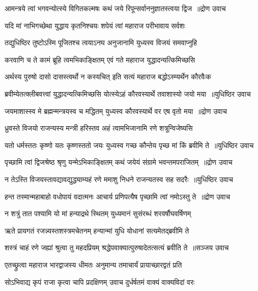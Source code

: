 \threelineshloka
{आमन्त्रये त्वां भगवन्योत्स्ये विगितकल्मषः}
{कथं जये रिपून्सर्वाननुज्ञातस्त्वया द्विज ॥द्रोण उवाच}
{}


\twolineshloka
{यदि मां नाभिगच्छेथा युद्धाय कृतनिश्चयः}
{शपेयं त्वां महाराज परीभावाय सर्वशः}


\twolineshloka
{तद्युधिष्ठिर तुष्टोऽस्मि पूजितश्च त्वयाऽनघ}
{अनुजानामि युध्यस्व विजयं समवाप्नुहि}


\twolineshloka
{करवाणि च ते कामं ब्रूहि त्वमभिकाङ्क्षितम्}
{एवं गते महाराज युद्धादन्यत्किमिच्छसि}


\twolineshloka
{अर्थस्य पुरुषो दासो दासस्त्वर्थो न कस्यचित्}
{इति सत्यं महाराज बद्धोऽस्म्यर्थेन कौरवैःक}


\threelineshloka
{ब्रवीम्येतत्क्लीबवत्त्वां युद्धादन्यत्किमिच्छसि}
{योत्स्येऽहं कौरवस्यार्थे तवाशास्यो जयो मया ॥युधिष्ठिर उवाच}
{}


\threelineshloka
{जयमाशास्स्व मे ब्रह्मन्मन्त्रयस्व च मद्धितम्}
{युध्यस्व कौरवस्यार्थे वर एष वृतो मया ॥द्रोण उवाच}
{}


\twolineshloka
{ध्रुवस्ते विजयो राजन्यस्य मन्त्री हरिस्तव}
{अहं त्वामभिजानामि रणे शत्रून्विजेष्यसि}


\threelineshloka
{यतो धर्मस्ततः कृष्णो यतः कृष्णस्ततो जयः}
{युध्यस्व गच्छ कौन्तेय पृच्छ मां किं ब्रवीमि ते ॥युधिष्ठिर उवाच}
{}


\threelineshloka
{पृच्छामि त्वां द्विजश्रेष्ठ श्रृणु यन्मेऽभिकाङ्क्षितम्}
{कथं जयेयं संग्रामे भवन्तमपराजितम् ॥द्रोण उवाच}
{}


\threelineshloka
{न तेऽस्ति विजयस्तावद्यावद्युद्ध्याम्यहं रणे}
{ममाशु निधने राजन्यतस्व सह सदरैः ॥युधिष्ठिर उवाच}
{}


\threelineshloka
{हन्त तस्मान्महाबाहो वधोपायं वदात्मनः}
{आचार्य प्रणिपत्यैष पृच्छामि त्वां नमोऽस्तु ते ॥द्रोण उवाच}
{}


\twolineshloka
{न शत्रुं तात पश्यामि यो मां हन्याद्रथे स्थितम्}
{युध्यमानं सुसंरब्धं शरवर्षौघवर्षिणम्}


\threelineshloka
{ऋते प्रायगतं रजन्न्यस्तशस्त्रमचेतनम्}
{हन्यान्मां युधि योधानां सत्यमेतद्ब्रवीमि ते}
{}


\threelineshloka
{शस्त्रं चाहं रणे जह्यां श्रुत्वा तु महदप्रियम्}
{श्रद्धेपवाक्यात्पुरुषादेतत्सत्यं ब्रवीति ते ॥सञ्जय उवाच}
{}


\twolineshloka
{एतच्छ्रुत्वा महाराज भारद्वाजस्य धीमतः}
{अनुमान्य तमाचार्यं प्रायाच्छारद्वतं प्रति}


\twolineshloka
{सोऽभिवाद्य कृपं राजा कृत्वा चापि प्रदक्षिणम्}
{उवाच दुर्धर्षतमं वाक्यं वाक्यविदां वरः}


